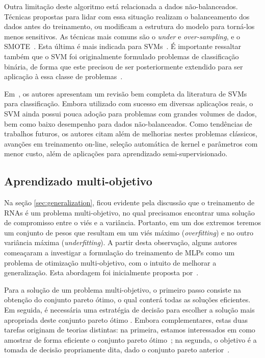 \documentclass[conference]{IEEEtran}
\begin{document}
 	Outra limitação deste algoritmo está relacionada a dados não-balanceados. Técnicas propostas para lidar com essa situação realizam o balanceamento dos dados antes do treinamento, ou modificam a estrutura do modelo para torná-los menos sensitivos. As técnicas mais comuns são o \textit{under} e \textit{over-sampling}, e o SMOTE~\cite{chawla2002smote}. Esta última é mais indicada para SVMs~\cite{chawla2003smoteboost}. É importante ressaltar também que o SVM foi originalmente formulado problemas de classificação binária, de forma que este precisou de ser posteriormente extendido para ser aplicação à essa classe de problemas~\cite{weston1998multi, liu2005one}.
 	
	
	Em~\cite{cervantes2020comprehensive}, os autores apresentam um revisão bem completa da literatura de SVMs para classificação. Embora utilizado com sucesso em diversas aplicaçõos reais, o SVM ainda possui pouca adoção para problemas com grandes volumes de dados, bem como baixo desempenho para dados não-balanceados. Como tendências de trabalhos futuros, os autores citam além de melhorias nestes problemas clássicos, avanções em treinamento on-line, seleção automática de kernel e parâmetros com menor custo, além de aplicações para aprendizado semi-supervisionado.
	
	\subsection{Aprendizado multi-objetivo}
	
	Na seção \ref{sec:generalization}, ficou evidente pela discussão que o treinamento de RNAs é um problema multi-objetivo, no qual precisamos encontrar uma solução de compromisso entre o viés e a variância. Portanto, em um dos extremos teremos um conjunto de pesos que resultam em um viés máximo (\textit{overfitting}) e no outro variância máxima (\textit{underfitting}). A partir desta observação, 
	alguns autores comeaçaram a investigar a formulação do treinamento de MLPs como um problema de otimização multi-objetivo, com o intuito de melhorar a generalização. Esta abordagem foi inicialmente proposta por~\cite{de2000improving}.
	
	Para a solução de um problema multi-objetivo, o primeiro passo consiste na obtenção do conjunto pareto ótimo, o qual conterá todas as soluções eficientes. Em seguida, é necessária uma estratégia de decisão para escolher a solução mais apropriada deste conjunto pareto ótimo \cite{deb2014multi}. Embora complementares, estas duas tarefas originam de teorias distintas: na primeira, estamos interessados em como amostrar de forma eficiente o conjunto pareto ótimo~\cite{collette2004multiobjective}; na segunda, o objetivo é a tomada de decisão propriamente dita, dado o conjunto pareto anterior~\cite{parreiras2005decision}. 
	
\end{document}
